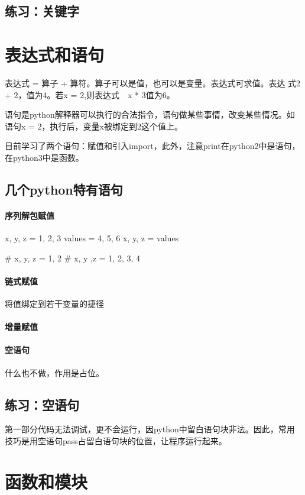 \subsection{练习：关键字}

\section{表达式和语句}
表达式 = 算子 + 算符。算子可以是值，也可以是变量。表达式可求值。表达
式2 + 2，值为4。若x = 2,则表达式　x * 3值为6。


语句是python解释器可以执行的合法指令，语句做某些事情，改变某些情况。如
语句x = 2，执行后，变量x被绑定到2这个值上。

目前学习了两个语句：赋值和引入import，此外，注意print在python2中是语句，
在python3中是函数。
\subsection{几个python特有语句}
\paragraph{序列解包赋值}
\begin{python}
  x, y, z = 1, 2, 3
  values = 4, 5, 6
  x, y, z = values
  
  # x, y, z = 1, 2
  # x, y ,z  = 1, 2, 3, 4
\end{python}
\paragraph{链式赋值}
将值绑定到若干变量的捷径 
\paragraph{增量赋值}
\paragraph{空语句}
什么也不做，作用是占位。
\subsection{练习：空语句}
第一部分代码无法调试，更不会运行，因python中留白语句块非法。因此，常用
技巧是用空语句pass占留白语句块的位置，让程序运行起来。

\section{函数和模块}
